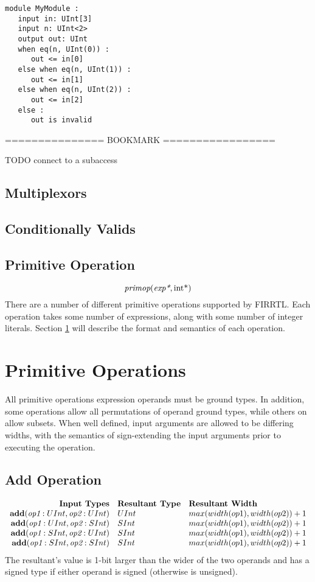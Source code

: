 \documentclass[12pt]{article}
\begin{document}
\begin{verbatim}
module MyModule :
   input in: UInt[3]
   input n: UInt<2>
   output out: UInt
   when eq(n, UInt(0)) :
      out <= in[0]
   else when eq(n, UInt(1)) :
      out <= in[1]
   else when eq(n, UInt(2)) :
      out <= in[2]            
   else :
      out is invalid
\end{verbatim}

=============== BOOKMARK =================

TODO connect to a subaccess

\subsection{Multiplexors}

\subsection{Conditionally Valids}

\subsection{Primitive Operation}
\[
\text{\em primop}(\text{\em exp*}, \text{int}\text{*})
\]
There are a number of different primitive operations supported by FIRRTL. 
Each operation takes some number of expressions, along with some number of integer literals.
Section \ref{primitives} will describe the format and semantics of each operation.


\section{Primitive Operations} \label{primitives}

All primitive operations expression operands must be ground types.
In addition, some operations allow all permutations of operand ground types, while others on allow subsets.
When well defined, input arguments are allowed to be differing widths, with the semantics of sign-extending the input arguments prior to executing the operation.

\subsection{Add Operation}
\[
\begin{array}{rll}
\text{\bf Input Types} & \text{\bf Resultant Type} & \text{\bf Resultant Width} \\
\text{\bf add}(\text{\em op1}:UInt, \text{\em op2}:UInt) & UInt & max(width(op1),width(op2)) + 1 \\
\text{\bf add}(\text{\em op1}:UInt, \text{\em op2}:SInt) & SInt & max(width(op1),width(op2)) + 1 \\
\text{\bf add}(\text{\em op1}:SInt, \text{\em op2}:UInt) & SInt & max(width(op1),width(op2)) + 1 \\
\text{\bf add}(\text{\em op1}:SInt, \text{\em op2}:SInt) & SInt & max(width(op1),width(op2)) + 1 \\
\end{array}
\]
The resultant's value is 1-bit larger than the wider of the two operands and has a signed type if either operand is signed (otherwise is unsigned).
\end{document}

